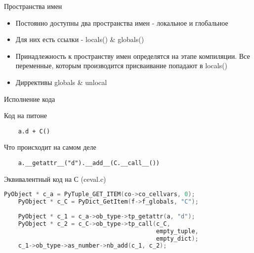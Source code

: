 \documentclass{article}
\begin{document}
\begin{center} Пространства имен \end{center}
\begin{itemize}
	\item Постоянно доступны два пространства имен - локальное и глобальное
	\item Для них есть ссылки - locals() \& globals()
	\item Принадлежность к пространству имен определятся на этапе компиляции. Все переменные, 
          которым производится присваивание попадают в locals()
	\item Диррективы globals \& unlocal
\end{itemize}
\newpage

\begin{center} Исполнение кода \end{center}

Код на питоне

\begin{lstlisting}
    a.d + C()
\end{lstlisting}
\vspace{1cm}

Что происходит на самом деле

\begin{lstlisting}
    a.__getattr__("d").__add__(C.__call__())
\end{lstlisting}

\vspace{1cm}
Эквивалентный код на С (ceval.c)

\begin{lstlisting}[language=C]
    PyObject * c_a = PyTuple_GET_ITEM(co->co_cellvars, 0);
    PyObject * c_C = PyDict_GetItem(f->f_globals, "C");
    
    PyObject * c_1 = c_a->ob_type->tp_getattr(a, "d");
    PyObject * c_2 = c_C->ob_type->tp_call(c_C, 
                                           empty_tuple, 
                                           empty_dict);
    c_1->ob_type->as_number->nb_add(c_1, c_2);
\end{lstlisting}
\newpage

\end{document}
